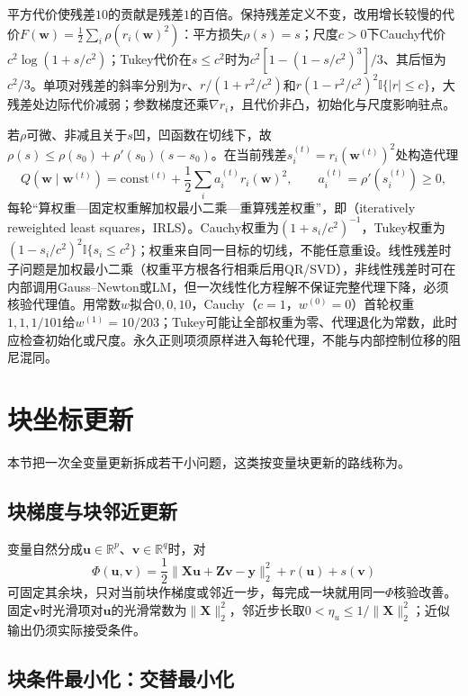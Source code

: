 平方代价使残差$10$的贡献是残差$1$的百倍。保持残差定义不变，改用增长较慢的代价$F(\bm w)=\frac12\sum_i\rho(r_i(\bm w)^2)$：平方损失$\rho(s)=s$；尺度$c>0$下Cauchy代价$c^2\log(1+s/c^2)$；Tukey代价在$s\leq c^2$时为$c^2[1-(1-s/c^2)^3]/3$、其后恒为$c^2/3$。单项对残差的斜率分别为$r$、$r/(1+r^2/c^2)$和$r(1-r^2/c^2)^2\mathbb I\{|r|\leq c\}$，大残差处边际代价减弱；参数梯度还乘$\nabla r_i$，且代价非凸，初始化与尺度影响驻点。

若$\rho$可微、非减且关于$s$凹，凹函数在切线下，故$\rho(s)\leq\rho(s_0)+\rho'(s_0)(s-s_0)$。在当前残差$s_i^{(t)}=r_i(\bm w^{(t)})^2$处构造代理
\begin{equation}
 Q(\bm w\mid\bm w^{(t)})
 =\mathrm{const}^{(t)}
 +\frac12\sum_i a_i^{(t)}r_i(\bm w)^2,
 \qquad a_i^{(t)}=\rho'(s_i^{(t)})\geq0,
 \label{eq:opt-irls-majorizer}
\end{equation}
每轮“算权重—固定权重解加权最小二乘—重算残差权重”，即（iteratively reweighted least squares，IRLS）。Cauchy权重为$(1+s_i/c^2)^{-1}$，Tukey权重为$(1-s_i/c^2)^2\mathbb I\{s_i\leq c^2\}$；权重来自同一目标的切线，不能任意重设。线性残差时子问题是加权最小二乘（权重平方根各行相乘后用QR/SVD），非线性残差时可在内部调用Gauss--Newton或LM，但一次线性化方程解不保证完整代理下降，必须核验代理值。用常数$w$拟合$0,0,10$，Cauchy（$c=1$，$w^{(0)}=0$）首轮权重$1,1,1/101$给$w^{(1)}=10/203$；Tukey可能让全部权重为零、代理退化为常数，此时应检查初始化或尺度。永久正则项须原样进入每轮代理，不能与内部控制位移的阻尼混同。

\section{块坐标更新}

本节把一次全变量更新拆成若干小问题，这类按变量块更新的路线称为。

\subsection{块梯度与块邻近更新}

变量自然分成$\bm u\in\mathbb R^p$、$\bm v\in\mathbb R^q$时，对
\[
 \Phi(\bm u,\bm v)=\frac12\|\bm X\bm u+\bm Z\bm v-\bm y\|_2^2+r(\bm u)+s(\bm v)
\]
可固定其余块，只对当前块作梯度或邻近一步，每完成一块就用同一$\Phi$核验改善。固定$\bm v$时光滑项对$\bm u$的光滑常数为$\|\bm X\|_2^2$，邻近步长取$0<\eta_u\leq1/\|\bm X\|_2^2$；近似输出仍须实际接受条件。

\subsection{块条件最小化：交替最小化}

